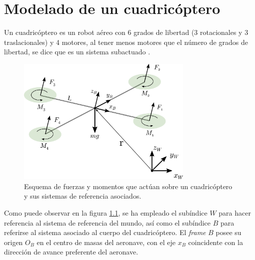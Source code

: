 \chapter{Modelado de un cuadricóptero}

Un cuadricóptero es un robot aéreo con 6 grados de libertad (3 rotacionales y 3 traslacionales) y 4 motores, al tener menos motores que el número de grados de libertad, se dice que es un sistema subactuado \cite{ferrin2011differential}\cite{MinimunSnap2011}\cite{mellinger2012trajectory}.

\begin{figure}[htb!]
	\centering
	\includegraphics[width=0.75\textwidth]{imagenes/uav_coordinate_system}
	\caption{Esquema de fuerzas y momentos que actúan sobre un cuadricóptero y sus sistemas de referencia asociados. }
	\label{modelado:uav_coordinate}
\end{figure}

Como puede observar en la figura \ref{modelado:uav_coordinate}, se ha  empleado el subíndice $W$ para hacer referencia al sistema de referencia del mundo, así como el subíndice $B$ para referirse al sistema asociado al cuerpo del cuadricóptero. El \textit{frame} $B$ posee su origen $O_B$ en el centro de masas del  aeronave, con el eje $x_B$ coincidente con la dirección de avance preferente del aeronave.


